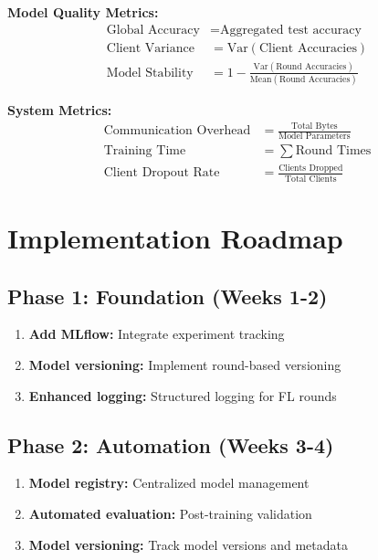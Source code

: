 \documentclass[12pt]{article}
\begin{document}
\textbf{Model Quality Metrics:}
\[
\begin{aligned}
\text{Global Accuracy} &= \text{Aggregated test accuracy} \\
\text{Client Variance} &= \text{Var}(\text{Client Accuracies}) \\
\text{Model Stability} &= 1 - \frac{\text{Var}(\text{Round Accuracies})}{\text{Mean}(\text{Round Accuracies})}
\end{aligned}
\]

\textbf{System Metrics:}
\[
\begin{aligned}
\text{Communication Overhead} &= \frac{\text{Total Bytes}}{\text{Model Parameters}} \\
\text{Training Time} &= \sum \text{Round Times} \\
\text{Client Dropout Rate} &= \frac{\text{Clients Dropped}}{\text{Total Clients}}
\end{aligned}
\]

\section{Implementation Roadmap}

\subsection{Phase 1: Foundation (Weeks 1-2)}

\begin{enumerate}
    \item \textbf{Add MLflow:} Integrate experiment tracking
    \item \textbf{Model versioning:} Implement round-based versioning
    \item \textbf{Enhanced logging:} Structured logging for FL rounds
\end{enumerate}

\subsection{Phase 2: Automation (Weeks 3-4)}

\begin{enumerate}
    \item \textbf{Model registry:} Centralized model management
    \item \textbf{Automated evaluation:} Post-training validation
    \item \textbf{Model versioning:} Track model versions and metadata
\end{enumerate}
\end{document}
